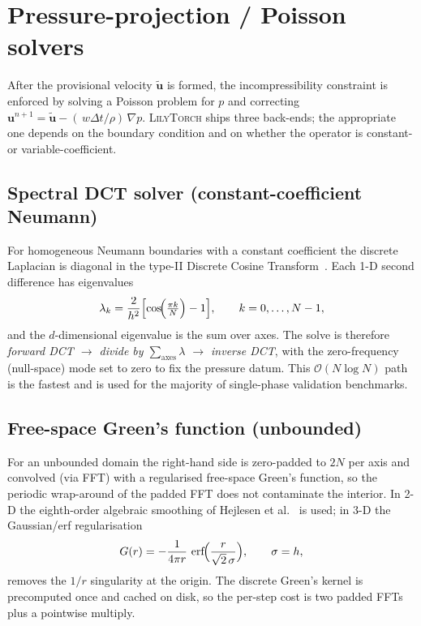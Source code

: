 \documentclass[10pt,onecolumn]{article}
\newcommand{\lilytorch}{\textsc{LilyTorch}\xspace}
\begin{document}
\section{Pressure-projection / Poisson solvers}\label{sec:s-poisson}

After the provisional velocity $\tilde{\mathbf u}$ is formed, the
incompressibility constraint is enforced by solving a Poisson problem
for $p$ and correcting
$\mathbf u^{n+1}=\tilde{\mathbf u}-(\,w\Delta t/\rho)\,\nabla p$.
\lilytorch ships three back-ends; the appropriate one depends on the
boundary condition and on whether the operator is constant- or
variable-coefficient.

\subsection{Spectral DCT solver (constant-coefficient Neumann)}

For homogeneous Neumann boundaries with a constant coefficient the
discrete Laplacian is diagonal in the type-II Discrete Cosine
Transform~\cite{makhoul1980dct}.  Each 1-D second difference has
eigenvalues
\begin{equation}
  \lambda_k = \frac{2}{h^2}\Bigl[\cos\!\Bigl(\tfrac{\pi k}{N}\Bigr)-1\Bigr],
  \qquad k=0,\dots,N-1,
  \label{eq:s-dct}
\end{equation}
and the $d$-dimensional eigenvalue is the sum over axes.  The solve is
therefore \emph{forward DCT $\rightarrow$ divide by
$\sum_{\text{axes}}\lambda$ $\rightarrow$ inverse DCT}, with the
zero-frequency (null-space) mode set to zero to fix the pressure datum.
This $\mathcal O(N\log N)$ path is the fastest and is used for the
majority of single-phase validation benchmarks.

\subsection{Free-space Green's function (unbounded)}

For an unbounded domain the right-hand side is zero-padded to $2N$ per
axis and convolved (via FFT) with a regularised free-space Green's
function, so the periodic wrap-around of the padded FFT does not
contaminate the interior.  In 2-D the eighth-order algebraic smoothing
of Hejlesen et al.~\cite{hejlesen2013high} is used; in 3-D the
Gaussian/erf regularisation
\begin{equation}
  G(r) = -\frac{1}{4\pi r}\,\operatorname{erf}\!\Bigl(\frac{r}{\sqrt 2\,
  \sigma}\Bigr),\qquad \sigma = h,
  \label{eq:s-green}
\end{equation}
removes the $1/r$ singularity at the origin.  The discrete Green's
kernel is precomputed once and cached on disk, so the per-step cost is
two padded FFTs plus a pointwise multiply.
\end{document}
